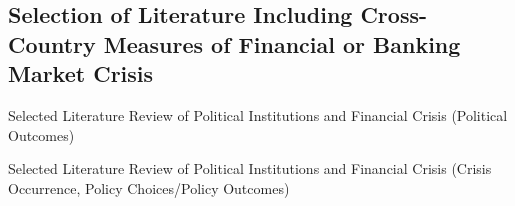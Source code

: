 \documentclass[]{article}
\begin{document}
\subsection*{Selection of Literature Including Cross-Country Measures of Financial or Banking Market Crisis}

\begin{table}[H]
\caption{Selected Literature Review of Political Institutions and Financial
Crisis (Political Outcomes)}


\label{LitRevTable2}
\begin{center}

\vspace{0.5cm}
{\tiny{

}}
\end{center}
\end{table}

\begin{table}[H]
\caption{Selected Literature Review of Political Institutions and Financial
Crisis (Crisis Occurrence, Policy Choices/Policy Outcomes)}


\label{LitRevTable}
\begin{center}

\vspace{0.5cm}
{\tiny{

}}
\end{center}
\end{table}
\end{document}
